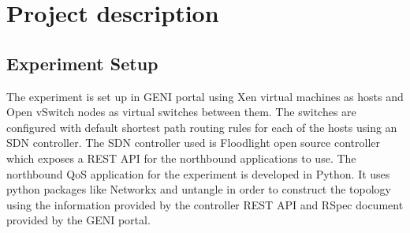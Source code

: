 \documentclass[paper=a4, fontsize=11pt]{scrartcl}	%
\numberwithin{equation}{section}		%
\numberwithin{figure}{section}			%
\numberwithin{table}{section}				%
\begin{document}
\section{Project description}
\subsection{Experiment Setup}
The experiment is set up in GENI portal using Xen virtual machines as hosts and Open vSwitch nodes as virtual switches between them. The switches are configured with default shortest path routing rules for each of the hosts using an SDN controller. The SDN controller used is Floodlight open source controller which exposes a REST API for the northbound applications to use. The northbound QoS application for the experiment is developed in Python. It uses python packages like Networkx and untangle in order to construct the topology using the information provided by the controller REST API and RSpec document provided by the GENI portal. 
\end{document}
